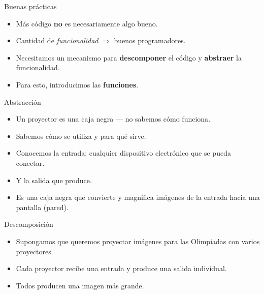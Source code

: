 \documentclass[mathserif]{beamer}
\begin{document}
\begin{frame}{Buenas prácticas}
    \begin{itemize}
        \item Más código {\orange\bfseries no} es necesariamente algo bueno.
        
        \item Cantidad de \textit{funcionalidad} $\Rightarrow$ buenos programadores.
        
        \item Necesitamos un mecanismo para {\blue\bfseries descomponer} el código y {\blue\bfseries abstraer} la funcionalidad.
        
        \item Para esto, introducimos las {\bfseries\orange funciones}.
    \end{itemize}
\end{frame}

\begin{frame}[fragile]{Abstracción}
    \begin{itemize}
        \item Un proyector es una caja negra --- {\blue no sabemos cómo funciona}. 
        \item Sabemos cómo se utiliza y para qué sirve.
        \item Conocemos la entrada: cualquier dispositivo electrónico que se pueda conectar.
        \item Y la salida que produce.
        \item Es una caja negra que convierte y magnifica imágenes de la entrada hacia una pantalla (pared).
        
    \end{itemize}
\end{frame}

\begin{frame}[fragile]{Descomposición}
    \begin{itemize}
        \item Supongamos que queremos proyectar imágenes para las Olimpiadas con varios proyectores.
        \item Cada proyector recibe una entrada y produce una salida individual.
        \item Todos producen una imagen más grande.
        
    \end{itemize}
\end{frame}
\end{document}
